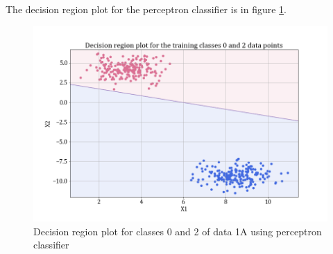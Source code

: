 \documentclass[11pt,a4paper]{article}
\begin{document}
The decision region plot for the perceptron classifier is in figure \ref{fig:perc_dec_reg_02}.
\begin{figure}[H]
    \centering
    \includegraphics[scale = 0.35]{images/training classes 0 and 2dec_reg_perceptron.png}
    \caption{Decision region plot for classes 0 and 2 of data 1A using perceptron classifier}
    \label{fig:perc_dec_reg_02}
\end{figure}

\end{document}
